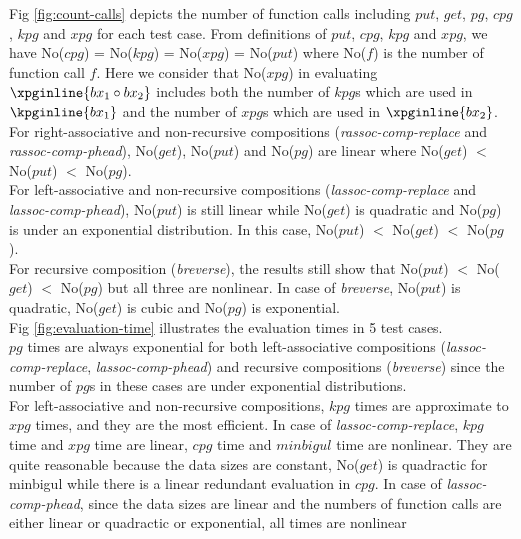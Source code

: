 Fig \ref{fig:count-calls} depicts the number of function calls including $put$, $get$, $pg$, $cpg$, $kpg$ and $xpg$ for each test case. From definitions of $put$, $cpg$, $kpg$ and $xpg$, we have No($cpg$) = No($kpg$) = No($xpg$) = No($put$) where No($f$) is the number of function call $f$. Here we consider that No($xpg$) in evaluating $\xpginline{bx_1 \circ bx_2}$ includes both the number of $kpg$s which are used in $\kpginline{bx_1}$ and the number of $xpg$s which are used in $\xpginline{bx_2}$.\\

For right-associative and non-recursive compositions (\textit{rassoc-comp-replace} and \textit{rassoc-comp-phead}), No($get$), No($put$) and No($pg$) are linear where No($get$) $<$ No($put$) $<$ No($pg$).\\

For left-associative and non-recursive compositions (\textit{lassoc-comp-replace} and \textit{lassoc-comp-phead}), No($put$) is still linear while No($get$) is quadratic and No($pg$) is under an exponential distribution. In this case, No($put$) $<$ No($get$) $<$ No($pg$).\\

For recursive composition (\textit{breverse}), the results still show that No($put$) $<$ No($get$) $<$ No($pg$) but all three are nonlinear. In case of \textit{breverse}, No($put$) is quadratic, No($get$) is cubic and No($pg$) is exponential.\\

Fig \ref{fig:evaluation-time} illustrates the evaluation times in 5 test cases.\\

$pg$ times are always exponential for both left-associative compositions (\textit{lassoc-comp-replace}, \textit{lassoc-comp-phead}) and recursive compositions (\textit{breverse}) since the number of $pg$s in these cases are under exponential distributions.\\

For left-associative and non-recursive compositions, $kpg$ times are approximate to $xpg$ times, and they are the most efficient. In case of \textit{lassoc-comp-replace}, $kpg$ time and $xpg$ time are linear, $cpg$ time and $minbigul$ time are nonlinear. They are quite reasonable because the data sizes are constant, No($get$) is quadractic for minbigul while there is a linear redundant evaluation in $cpg$. In case of \textit{lassoc-comp-phead}, since the data sizes are linear and the numbers of function calls are either linear or quadractic or exponential, all times are nonlinear\\

